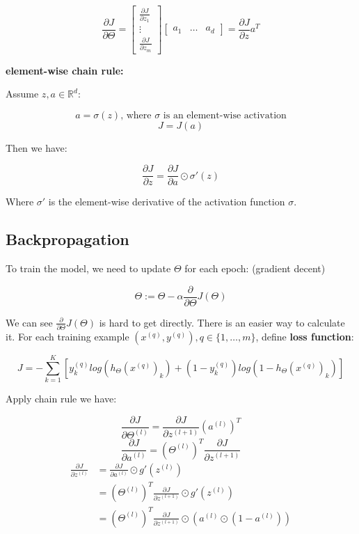 \documentclass{article}
\begin{document}
\[
\frac{\partial J}{\partial \Theta} = 
\begin{bmatrix}
\frac{\partial J}{\partial z_1}\\
\vdots\\
\frac{\partial J}{\partial z_m}
\end{bmatrix}
\begin{bmatrix}
a_1 & \dots & a_d
\end{bmatrix}
= \frac{\partial J}{\partial z} a^T
\]

\noindent \textbf{element-wise chain rule:}

\noindent Assume \(z, a \in \mathbb{R}^d\):

\[a = \sigma(z) \text{, where \(\sigma\) is an element-wise activation}\]
\[J = J(a)\]

\noindent Then we have:

\[\frac{\partial J}{\partial z} = \frac{\partial J}{\partial a} \odot \sigma'(z)\]

\noindent Where \(\sigma'\) is the element-wise derivative of the activation function \(\sigma\).

\subsection{Backpropagation}

\noindent To train the model, we need to update \(\Theta\) for each epoch: (gradient decent)

\[\Theta := \Theta - \alpha  \frac{\partial}{\partial \Theta} J(\Theta)\]

\noindent We can see \(\frac{\partial}{\partial \Theta} J(\Theta)\) is hard to get directly. There is an easier way to calculate it. For each training example \((x^{(q)}, y^{(q)}), q \in \{1, \dots, m\}\), define \textbf{loss function}:

\[J = -\sum_{k = 1}^{K} [y^{(q)}_k log(h_{\Theta} (x^{(q)})_k) + (1 - y^{(q)}_k) log(1 - h_{\Theta}(x^{(q)})_k)] \]

\noindent Apply chain rule we have:

\[\frac{\partial J}{\partial \Theta^{(l)}} = \frac{\partial J}{\partial z^{(l + 1)}} (a^{(l)})^T\]
\[\frac{\partial J}{\partial a^{(l)}} = (\Theta^{(l)})^T \frac{\partial J}{\partial z^{(l + 1)}}\]
\begin{equation*}
\begin{split}
\frac{\partial J}{\partial z^{(l)}}
& = \frac{\partial J}{\partial a^{(l)}} \odot g'(z^{(l)}) \\
& = (\Theta^{(l)})^T \frac{\partial J}{\partial z^{(l + 1)}} \odot g'(z^{(l)}) \\
& = (\Theta^{(l)})^T \frac{\partial J}{\partial z^{(l + 1)}} \odot (a^{(l)} \odot (1 - a^{(l)}))
\end{split}
\end{equation*}
\end{document}
